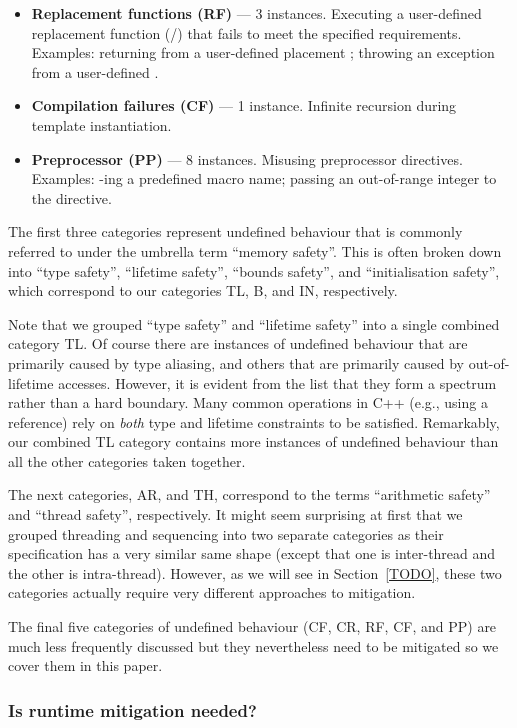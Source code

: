 \begin{itemize}
\item \textbf{Replacement functions (RF)} --- 3 instances. Executing a user-defined replacement function (/) that fails to meet the specified requirements. Examples: returning  from a user-defined placement ; throwing an exception from a user-defined .
\item \textbf{Compilation failures (CF)} --- 1 instance. Infinite recursion during template instantiation.
\item \textbf{Preprocessor (PP)} --- 8 instances. Misusing preprocessor directives. Examples: -ing a predefined macro name; passing an out-of-range integer to the  directive.
\end{itemize}

The first three categories represent undefined behaviour that is commonly referred to under the umbrella term ``memory safety''. This is often broken down into ``type safety'',  ``lifetime safety'', ``bounds safety'', and ``initialisation safety'', which correspond to our categories TL, B, and IN, respectively.

Note that we grouped ``type safety'' and ``lifetime safety'' into a single combined category TL. Of course there are instances of undefined behaviour that are primarily caused by type aliasing, and others that are primarily caused by out-of-lifetime accesses. However, it is evident from the list that they form a spectrum rather than a hard boundary. Many common operations in C++ (e.g., using a reference) rely on \emph{both} type and lifetime constraints to be satisfied. Remarkably, our combined TL category contains more instances of undefined behaviour than all the other categories taken together.

The next categories, AR, and TH, correspond to the terms ``arithmetic safety'' and ``thread safety'', respectively. It might seem surprising at first that we grouped threading and sequencing into two separate categories as their specification has a very similar same shape (except that one is inter-thread and the other is intra-thread). However, as we will see in Section~\ref{TODO}, these two categories actually require very different approaches to mitigation.

The final five categories of undefined behaviour (CF, CR, RF, CF, and PP) are much less frequently discussed but they nevertheless need to be mitigated so we cover them in this paper.

\subsubsection{Is runtime mitigation needed?}

